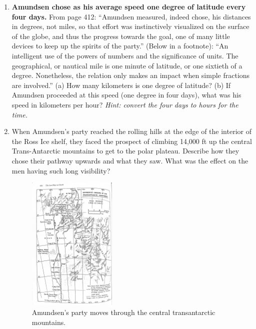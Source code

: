 \documentclass{article}
\begin{document}
\begin{enumerate}
\item \textbf{Amundsen chose as his average speed one degree of latitude every four days.} From page 412: ``Amundsen measured, indeed chose, his distances in degrees, not miles, so that effort was instinctively visualized on the surface of the globe, and thus the progress towards the goal, one of many little devices to keep up the spirits of the party.''  (Below in a footnote): ``An intelligent use of the powers of numbers and the significance of units.  The geographical, or nautical mile is one minute of latitude, or one sixtieth of a degree.  Nonetheless, the relation only makes an impact when simple fractions are involved.''  (a) How many kilometers is one degree of latitude?  (b) If Amundsen proceeded at this speed (one degree in four days), what was his speed in kilometers per hour?  \textit{Hint: convert the four days to hours for the time.} \\ \vspace{2cm}
\clearpage
\item When Amundsen's party reached the rolling hills at the edge of the interior of the Ross Ice shelf, they faced the prospect of climbing 14,000 ft up the central Trans-Antarctic mountains to get to the polar plateau.  Describe how they chose their pathway upwards and what they saw.  What was the effect on the men having such long visibility? \\ \vspace{2cm}
\begin{figure}
\centering
\includegraphics[width=0.4\textwidth]{map.jpg}
\caption{\label{fig:map} Amundsen's party moves through the central transantarctic mountains.}
\end{figure}
\end{enumerate}
\end{document}
